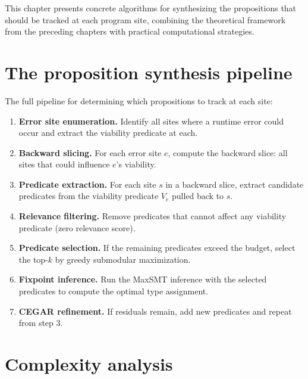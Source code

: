 \documentclass[11pt]{report}
\theoremstyle{definition}
\theoremstyle{plain}
\begin{document}
This chapter presents concrete algorithms for synthesizing the propositions
that should be tracked at each program site, combining the theoretical
framework from the preceding chapters with practical computational
strategies.

\section{The proposition synthesis pipeline}

The full pipeline for determining which propositions to track at each site:

\begin{enumerate}[nosep]
  \item \textbf{Error site enumeration.} Identify all sites where a runtime
        error could occur and extract the viability predicate at each.
  \item \textbf{Backward slicing.} For each error site $e$, compute the
        backward slice: all sites that could influence $e$'s viability.
  \item \textbf{Predicate extraction.} For each site $s$ in a backward slice,
        extract candidate predicates from the viability predicate $V_e$
        pulled back to $s$.
  \item \textbf{Relevance filtering.} Remove predicates that cannot affect
        any viability predicate (zero relevance score).
  \item \textbf{Predicate selection.} If the remaining predicates exceed the
        budget, select the top-$k$ by greedy submodular maximization.
  \item \textbf{Fixpoint inference.} Run the MaxSMT inference with the
        selected predicates to compute the optimal type assignment.
  \item \textbf{CEGAR refinement.} If residuals remain, add new predicates
        and repeat from step 3.
\end{enumerate}

\section{Complexity analysis}
\end{document}

